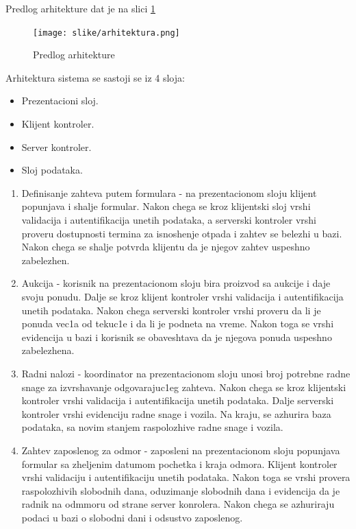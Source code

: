 \documentclass[10 pt]{article}
\begin{document}
		
		Predlog arhitekture dat je na slici \ref{fig:Arhitektura}
		
		\begin{figure}[H]
			\centering
			\texttt{[image: slike/arhitektura.png]}\\
			\caption{Predlog arhitekture}
			\label{fig:Arhitektura}
		\end{figure}
		
			
		Arhitektura sistema se sastoji se iz 4 sloja:
			\begin{itemize}
				\item Prezentacioni sloj.
				\item Klijent kontroler.
				\item Server kontroler.
				\item Sloj podataka.
			\end{itemize}	

		\begin{enumerate}
			\item Definisanje zahteva putem formulara - na prezentacionom sloju klijent popunjava i shalje formular. Nakon chega se kroz klijentski sloj vrshi validacija i autentifikacija unetih podataka, a serverski kontroler vrshi proveru dostupnosti termina za isnoshenje otpada i zahtev se belezhi u bazi. Nakon chega se shalje potvrda klijentu da je njegov zahtev uspeshno zabelezhen.
			
			\item Aukcija - korisnik na prezentacionom sloju bira proizvod sa aukcije i daje svoju ponudu. Dalje se kroz klijent kontroler vrshi validacija i autentifikacija unetih podataka. Nakon chega serverski kontroler vrshi proveru da li je ponuda vec1a od tekuc1e i da li je podneta na vreme. Nakon toga se vrshi evidencija u bazi i korisnik se obaveshtava da je njegova ponuda uspeshno zabelezhena.
			
			\item Radni nalozi - koordinator na prezentacionom sloju unosi broj potrebne radne snage za izvrshavanje odgovarajuc1eg zahteva. Nakon chega se kroz klijent{s}ki kontroler vrshi validacija i autentifikacija unetih podataka. Dalje serverski kontroler vrshi evidenciju radne snage i vozila. Na kraju, se azhurira baza podataka, sa novim stanjem raspolozhive radne snage i vozila.
			
			\item Zahtev zaposlenog za odmor - zaposleni na prezentacionom sloju popunjava formular sa zheljenim datumom pochetka i kraja odmora. Klijent kontroler vrshi validaciju i autentifikaciju unetih podataka. Nakon toga se vrshi provera raspolozhivih slobodnih dana, oduzimanje slobodnih dana i evidencija da je radnik na odmmoru od strane server konrolera. Nakon chega se azhuriraju podaci u bazi o slobodni dani i odsustvo zaposlenog.
			
		\end{enumerate}
	
\end{document}
